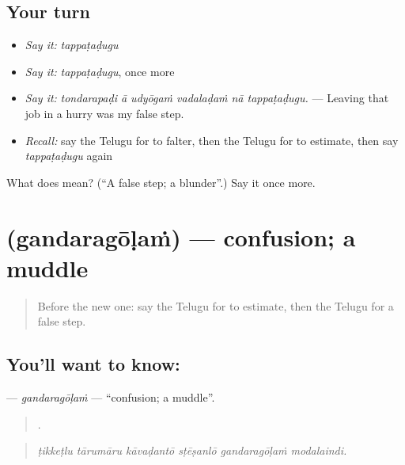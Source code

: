 \subsection*{Your turn}
\begin{itemize}
\raggedright
  \item \emph{Say it:} \emph{tappaṭaḍugu}
  \item \emph{Say it:} \emph{tappaṭaḍugu}, once more
  \item \emph{Say it:} \emph{tondarapaḍi ā udyōgaṁ vadalaḍaṁ nā tappaṭaḍugu.} — Leaving that job in a hurry was my false step.
  \item \emph{Recall:} say the Telugu for to falter, then the Telugu for to estimate, then say \emph{tappaṭaḍugu} again
\end{itemize}

\begin{tcolorbox}[breakable,colback=teal!4,colframe=teal!35!black,title={Before you move on}]
What does  mean? (\textquotedblleft{}A false step; a blunder\textquotedblright{}.) Say it once more.
\end{tcolorbox}
\section[\texorpdfstring{\te{గందరగోళం} (gandaragōḷaṁ)}{గందరగోళం (gandaragōḷaṁ)}]{ (gandaragōḷaṁ) — confusion; a muddle}

\label{lesson:TE-C492-gandaragolam}



\begin{quote}
Before the new one: say the Telugu for to estimate, then the Telugu for a false step.
\end{quote}

\subsection*{You'll want to know: }
\textbf{} — \emph{gandaragōḷaṁ} — \textquotedblleft{}confusion; a muddle\textquotedblright{}.

\begin{quote}
     .
\end{quote}

\begin{quote}
\emph{ṭikkeṭlu tārumāru kāvaḍantō sṭēṣanlō gandaragōḷaṁ modalaindi.}
\end{quote}

